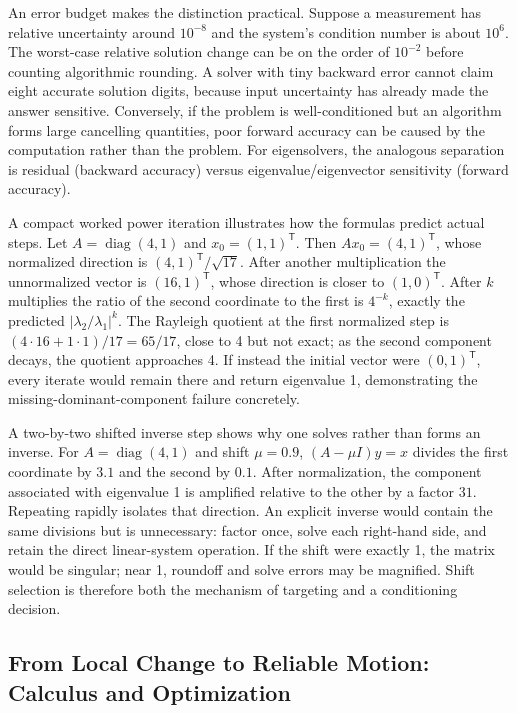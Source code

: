 An error budget makes the distinction practical. Suppose a measurement has relative uncertainty around \(10^{-8}\) and the system's condition number is about \(10^6\). The worst-case relative solution change can be on the order of \(10^{-2}\) before counting algorithmic rounding. A solver with tiny backward error cannot claim eight accurate solution digits, because input uncertainty has already made the answer sensitive. Conversely, if the problem is well-conditioned but an algorithm forms large cancelling quantities, poor forward accuracy can be caused by the computation rather than the problem. For eigensolvers, the analogous separation is residual (backward accuracy) versus eigenvalue/eigenvector sensitivity (forward accuracy).

A compact worked power iteration illustrates how the formulas predict actual steps. Let \(A=\operatorname{diag}(4,1)\) and \(x_0=(1,1)^\mathsf T\). Then \(Ax_0=(4,1)^\mathsf T\), whose normalized direction is \((4,1)^\mathsf T/\sqrt{17}\). After another multiplication the unnormalized vector is \((16,1)^\mathsf T\), whose direction is closer to \((1,0)^\mathsf T\). After \(k\) multiplies the ratio of the second coordinate to the first is \(4^{-k}\), exactly the predicted \(|\lambda_2/\lambda_1|^k\). The Rayleigh quotient at the first normalized step is \((4\cdot16+1\cdot1)/17=65/17\), close to 4 but not exact; as the second component decays, the quotient approaches 4. If instead the initial vector were \((0,1)^\mathsf T\), every iterate would remain there and return eigenvalue 1, demonstrating the missing-dominant-component failure concretely.

A two-by-two shifted inverse step shows why one solves rather than forms an inverse. For \(A=\operatorname{diag}(4,1)\) and shift \(\mu=0.9\), \((A-\mu I)y=x\) divides the first coordinate by \(3.1\) and the second by \(0.1\). After normalization, the component associated with eigenvalue 1 is amplified relative to the other by a factor \(31\). Repeating rapidly isolates that direction. An explicit inverse would contain the same divisions but is unnecessary: factor once, solve each right-hand side, and retain the direct linear-system operation. If the shift were exactly 1, the matrix would be singular; near 1, roundoff and solve errors may be magnified. Shift selection is therefore both the mechanism of targeting and a conditioning decision.

\subsection{From Local Change to Reliable Motion: Calculus and Optimization}\label{01-foundations-i-ch020-from-local-change-to-reliable-motion-calculus-and-optimization}

